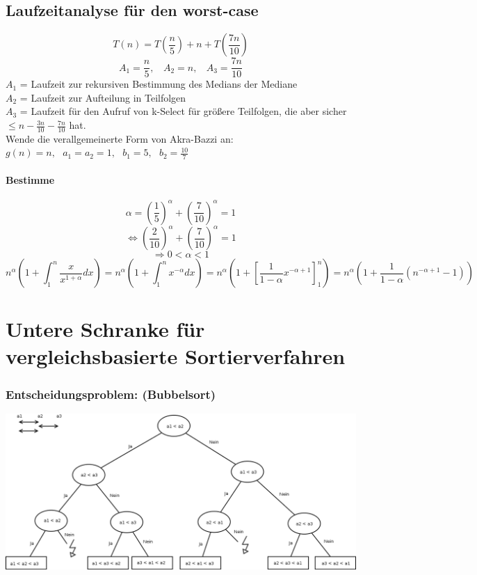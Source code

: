 \subsection{Laufzeitanalyse für den worst-case}
\[T(n) = T\left(\frac{n}{5}\right)+n+T \left(\frac{7n}{10} \right) \]
\[A_1 = \frac{n}{5},~~~~A_2 = n,~~~~A_3= \frac{7n}{10}\]
$A_1$ = Laufzeit zur rekursiven Bestimmung des Medians der Mediane\\
$A_2$ = Laufzeit zur Aufteilung in Teilfolgen\\
$A_3$ = Laufzeit für den Aufruf von k-Select  für größere Teilfolgen, die aber sicher $\leq n - \frac{3n}{10} - \frac{7n}{10}$ hat.\\

Wende die verallgemeinerte Form von Akra-Bazzi an:\\
$g(n)=n, ~~~a_1=a_2=1, ~~~b_1=5, ~~~b_2=\frac{10}{7}$\\
\paragraph{Bestimme}
\[\alpha = \left(\frac{1}{5}\right)^{\alpha} + \left(\frac{7}{10}\right)^{\alpha} = 1\]
\[\Leftrightarrow \left(\frac{2}{10}\right)^{\alpha} + \left(\frac{7}{10}\right)^{\alpha} = 1\]
\[\Rightarrow 0 < \alpha < 1 \]
\[n^{\alpha}\left(1+\int_1^n \frac{x}{x^{1+\alpha}} dx\right) = n^{\alpha}\left(1+\int_1^n x^{-\alpha} dx\right) = n^{\alpha}\left(1+ \left[\frac{1}{1-\alpha} x^{-\alpha+1} \right]_1^n\right) = n^{\alpha}\left(1+\frac{1}{1-\alpha} \left(n^{-\alpha+1}-1\right)\right)\]

\newpage

\section{Untere Schranke für vergleichsbasierte Sortierverfahren}
\subsubsection*{Entscheidungsproblem: (Bubbelsort)}
\includegraphics[width=\linewidth]{08/Grafik/img2.png}\\

